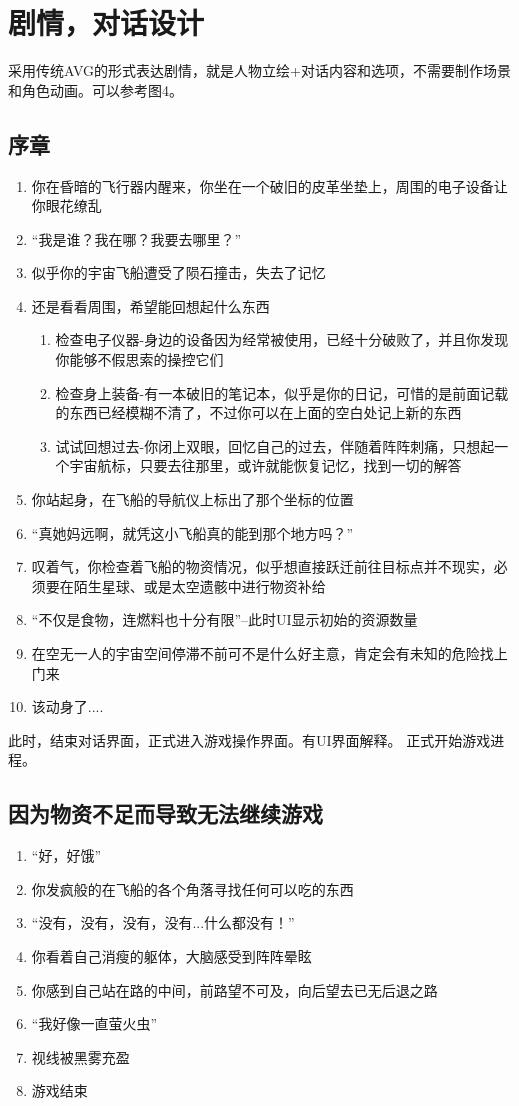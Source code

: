 \documentclass{ctexart}
\begin{document}
	\section{剧情，对话设计}
		采用传统AVG的形式表达剧情，就是人物立绘+对话内容和选项，不需要制作场景和角色动画。可以参考图4。
		\subsection{序章}
			\begin{enumerate}
				\item 你在昏暗的飞行器内醒来，你坐在一个破旧的皮革坐垫上，周围的电子设备让你眼花缭乱
				\item “我是谁？我在哪？我要去哪里？”
				\item 似乎你的宇宙飞船遭受了陨石撞击，失去了记忆
				\item 还是看看周围，希望能回想起什么东西
				\begin{enumerate}
				\item 检查电子仪器-身边的设备因为经常被使用，已经十分破败了，并且你发现你能够不假思索的操控它们
				\item 检查身上装备-有一本破旧的笔记本，似乎是你的日记，可惜的是前面记载的东西已经模糊不清了，不过你可以在上面的空白处记上新的东西
				\item 试试回想过去-你闭上双眼，回忆自己的过去，伴随着阵阵刺痛，只想起一个宇宙航标，只要去往那里，或许就能恢复记忆，找到一切的解答
				\end{enumerate}
				\item 你站起身，在飞船的导航仪上标出了那个坐标的位置
				\item “真她妈远啊，就凭这小飞船真的能到那个地方吗？”
				\item 叹着气，你检查着飞船的物资情况，似乎想直接跃迁前往目标点并不现实，必须要在陌生星球、或是太空遗骸中进行物资补给
				\item “不仅是食物，连燃料也十分有限”--此时UI显示初始的资源数量
				\item 在空无一人的宇宙空间停滞不前可不是什么好主意，肯定会有未知的危险找上门来
				\item 该动身了....
			\end{enumerate}
			此时，结束对话界面，正式进入游戏操作界面。有UI界面解释。
			正式开始游戏进程。
		\subsection{因为物资不足而导致无法继续游戏}
			\begin{enumerate}
				\item “好，好饿”
				\item 你发疯般的在飞船的各个角落寻找任何可以吃的东西
				\item “没有，没有，没有，没有...什么都没有！”
				\item 你看着自己消瘦的躯体，大脑感受到阵阵晕眩
				\item 你感到自己站在路的中间，前路望不可及，向后望去已无后退之路
				\item “我好像一直萤火虫”
				\item 视线被黑雾充盈
				\item 游戏结束
			\end{enumerate}
\end{document}
